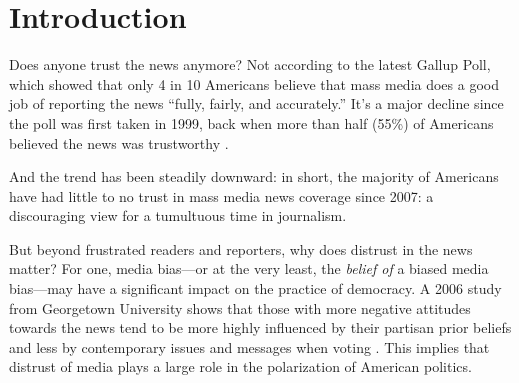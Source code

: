 
\chapter{Introduction} 

Does anyone trust the news anymore? Not according to the latest Gallup Poll, which showed that only 4 in 10 Americans believe that mass media does a good job of reporting the news ``fully, fairly, and accurately.'' It's a major decline since the poll was first taken in 1999, back when more than half (55\%) of Americans believed the news was trustworthy \cite{Gallup-trust-2015}.

And the trend has been steadily downward: in short, the majority of Americans have had little to no trust in mass media news coverage since 2007: a discouraging view for a tumultuous time in journalism.

But beyond frustrated readers and reporters, why does distrust in the news matter? For one, media bias---or at the very least, the \emph{belief of} a biased media bias---may have a significant impact on the practice of democracy. A 2006 study from Georgetown University shows that those with more negative attitudes towards the news tend to be more highly influenced by their partisan prior beliefs and less by contemporary issues and messages when voting \cite{ladd2005attitudes}. This implies that distrust of media plays a large role in the polarization of American politics.



  



